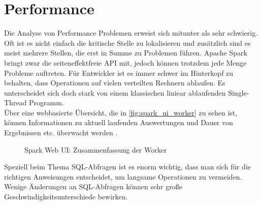 \newpage
\section{Performance}
Die Analyse von Performance Problemen erweist sich mitunter als sehr schwierig. Oft ist es nicht einfach die kritische Stelle zu lokalisieren und zusätzlich sind es meist mehrere Stellen, die erst in Summe zu Problemen führen. Apache Spark bringt zwar die seiteneffektfreie API mit, jedoch können trotzdem jede Menge Probleme auftreten. Für Entwickler ist es immer schwer im Hinterkopf zu behalten, dass Operationen auf vielen verteilten Rechnern ablaufen. Es unterscheidet sich doch stark von einem klassischen liniear ablaufenden Single-Thread Programm.\\ 

\noindent
Über eine webbasierte Übersicht, die in \autoref{fig:spark_ui_worker} zu sehen ist, können Informationen zu aktuell laufenden Auswertungen und Dauer von Ergebnissen etc. überwacht werden \cite[12]{AAWS15}.

\begin{figure}[h]
  \centering
  \caption{Spark Web UI: Zusammenfassung der Worker}\label{fig:spark_ui_worker}
\end{figure}

\noindent
Speziell beim Thema SQL-Abfragen ist es enorm wichtig, dass man sich für die richtigen Anweisungen entscheidet, um langsame Operationen zu vermeiden. 
Wenige Änderungen an SQL-Abfragen können sehr große Geschwindigkeitsunterschiede bewirken.



